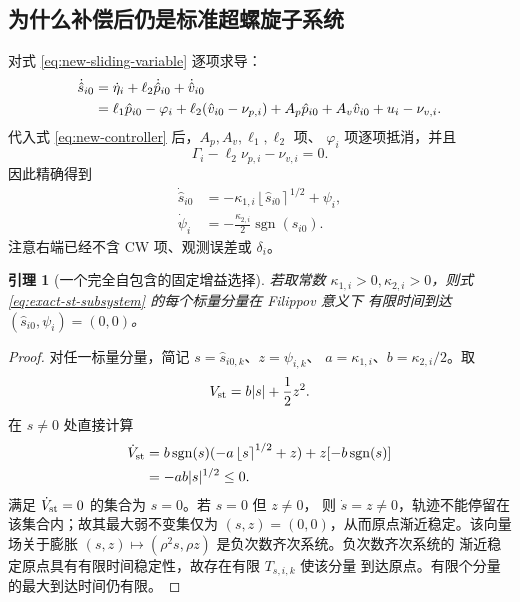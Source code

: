 \documentclass[UTF8,a4paper,12pt]{ctexart}
\newtheorem{lemma}{引理}
\newcommand{\sgn}{\operatorname{sgn}}
\newcommand{\ipow}[2]{\left\lfloor #1\right\rceil^{#2}}
\begin{document}
\subsection{为什么补偿后仍是标准超螺旋子系统}

对式 \eqref{eq:new-sliding-variable} 逐项求导：
\begin{align}
 \dot{\hat s}_{i0}
 & =\dot\eta_i+\ell_2\dot{\hat p}_{i0}
 +\dot{\hat v}_{i0} \notag\\
 & =\ell_1\hat p_{i0}-\varphi_i
 +\ell_2(\hat v_{i0}-\nu_{p,i})
 +A_p\hat p_{i0}+A_v\hat v_{i0}+u_i-\nu_{v,i}.
 \label{eq:sliding-derivative-before-control}
\end{align}
代入式 \eqref{eq:new-controller} 后，$A_p,A_v,\ell_1,\ell_2$ 项、
$\varphi_i$ 项逐项抵消，并且
\begin{equation}
 \Gamma_i-\ell_2\nu_{p,i}-\nu_{v,i}=0.
\end{equation}
因此精确得到
\begin{equation}
\begin{aligned}
 \dot{\hat s}_{i0}
 &=-\kappa_{1,i}\ipow{\hat s_{i0}}{1/2}+\psi_i,\\
 \dot\psi_i
 &=-\frac{\kappa_{2,i}}2\sgn(\hat s_{i0}).
\end{aligned}
\label{eq:exact-st-subsystem}
\end{equation}
注意右端已经不含 CW 项、观测误差或 $\delta_i$。

\begin{lemma}[一个完全自包含的固定增益选择]
若取常数 $\kappa_{1,i}>0,\kappa_{2,i}>0$，则式
\eqref{eq:exact-st-subsystem} 的每个标量分量在 Filippov 意义下
有限时间到达 $(\hat s_{i0},\psi_i)=(0,0)$。
\end{lemma}

\begin{proof}
对任一标量分量，简记 $s=\hat s_{i0,k}$、$z=\psi_{i,k}$、
$a=\kappa_{1,i}$、$b=\kappa_{2,i}/2$。取
\begin{equation}
 V_{\rm st}=b|s|+\frac12z^2.
\end{equation}
在 $s\ne0$ 处直接计算
\begin{align}
 \dot V_{\rm st}
 &=b\sgn(s)(-a\ipow{s}{1/2}+z)
 +z[-b\sgn(s)]\\
 &=-ab|s|^{1/2}\le0.
\end{align}
满足 $\dot V_{\rm st}=0$ 的集合为 $s=0$。若 $s=0$ 但 $z\ne0$，
则 $\dot s=z\ne0$，轨迹不能停留在该集合内；故其最大弱不变集仅为
$(s,z)=(0,0)$，从而原点渐近稳定。该向量场关于膨胀
$(s,z)\mapsto(\rho^2s,\rho z)$ 是负次数齐次系统。负次数齐次系统的
渐近稳定原点具有有限时间稳定性，故存在有限 $T_{s,i,k}$ 使该分量
到达原点。有限个分量的最大到达时间仍有限。
\end{proof}
\end{document}
